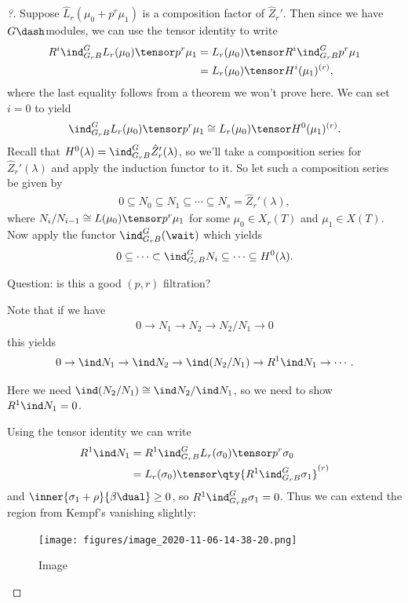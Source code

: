 \begin{proof}[?]

Suppose \(\hat{L}_r(\mu_0 + p^r\mu_1)\) is a composition factor of
\(\hat{Z}_r'\). Then since we have \(G\dash\)modules, we can use the
tensor identity to write
\begin{align*}  
R^i \ind_{G_r B}^{G} L_r(\mu_0) \tensor p^r \mu_1
&= L_r(\mu_0) \tensor R^i \ind_{G_r B}^{G} p^r \mu_1 \\
&= L_r(\mu_0) \tensor H^i(\mu_1)^{(r)}
,\end{align*} where the last equality follows from a theorem we won't
prove here. We can set \(i=0\) to yield
\begin{align*}  
\ind_{G_r B}^{G} L_r(\mu_0) \tensor p^r \mu_1
\cong L_r(\mu_0) \tensor H^0(\mu_1)^{(r)}
.\end{align*} Recall that
\(H^0(\lambda) = \ind_{G_r B}^{G} \hat{Z}_r'(\lambda)\), so we'll take a
composition series for \(\hat{Z}_r'(\lambda)\) and apply the induction
functor to it. So let such a composition series be given by
\begin{align*}  
0\subseteq N_0 \subseteq N_1 \subseteq \cdots \subseteq N_s = \hat{Z}_r'(\lambda)
,\end{align*} where \(N_i / N_{i-1} \cong L(\mu_0) \tensor p^r \mu_1\)
for some \(\mu_0\in X_r(T)\) and \(\mu_1\in X(T)\). Now apply the
functor \(\ind_{G_r B}^{G}(\wait)\) which yields
\begin{align*}  
0\subseteq \cdots \subset \ind_{G_r B}^{G} N_i \subseteq \cdots \subseteq H^0(\lambda)
.\end{align*}

Question: is this a good \((p, r)\) filtration?

\begin{warnings}

Note that if we have
\begin{align*}  
0 \to N_1 \to N_2 \to N_2/N_1 \to 0
\end{align*} this yields
\begin{align*}  
0 \to \ind N_1 \to \ind N_2 \to \ind (N_2/N_1) \to R^1 \ind N_1 \to \cdots
.\end{align*}

Here we need \(\ind(N_2/N_1) \cong \ind N_2 / \ind N_1\), so we need to
show \(R^1 \ind N_1 = 0\).

\end{warnings}

Using the tensor identity we can write
\begin{align*}  
R^1 \ind N_1
&= R^1 \ind_{G_r B}^G L_r(\sigma_0) \tensor p^r \sigma_0 \\
&= L_r(\sigma_0) \tensor \qty{R^1 \ind_{G_r B}^G \sigma_1 }^{(r)}
\end{align*} and \(\inner{\sigma_1 + \rho}{\beta\dual} \geq 0\), so
\(R^1 \ind_{G_r B}^G \sigma_1 = 0\). Thus we can extend the region from
Kempf's vanishing slightly:

\begin{figure}
\centering
\texttt{[image: figures/image\_2020-11-06-14-38-20.png]}
\caption{Image}
\end{figure}

\end{proof}

